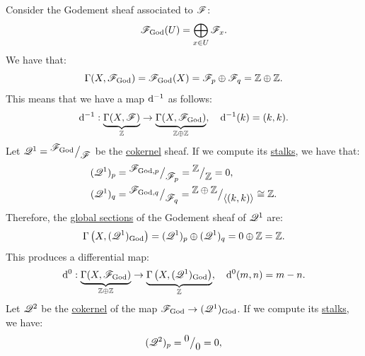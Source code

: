 \documentclass[../../main]{subfiles}
\begin{document}
\begin{example}
  Consider the Godement sheaf associated to \(\mathscr{F}\):
  \begin{equation*}
    \mathscr{F}_{\operatorname{God}}(U) = \bigoplus_{x \in U} \mathscr{F}_{x}.
  \end{equation*}
  We have that:
  \begin{equation*}
    \Gamma(X, \mathscr{F}_{\operatorname{God}}) = \mathscr{F}_{\operatorname{God}}(X) = \mathscr{F}_{p} \oplus \mathscr{F}_{q} = \mathbb{Z} \oplus \mathbb{Z}.
  \end{equation*}
  This means that we have a map \(\mathrm{d}^{-1}\) as follows:
  \begin{equation*}
    \mathrm{d}^{-1}: \underbrace{\Gamma(X, \mathscr{F})}_{\mathbb{Z}} \to \underbrace{\Gamma(X, \mathscr{F}_{\operatorname{God}})}_{\mathbb{Z} \oplus \mathbb{Z}}, \quad \mathrm{d}^{-1}(k) = (k, k).
  \end{equation*}
  Let \(\mathscr{Q}^1 = {^{\textstyle \mathscr{F}_{\operatorname{God}}}\big/_{\textstyle \mathscr{F}}}\) be the \hyperref[def:categorical-cokernel]{cokernel} sheaf.
  If we compute its \hyperref[def:stalk]{stalks}, we have that:
  \begin{align*}
    (\mathscr{Q}^1)_{p} &= {^{\textstyle \mathscr{F}_{\operatorname{God}, p}}\big/_{\textstyle \mathscr{F}_{p}}} = {^{\textstyle \mathbb{Z}}\big/_{\textstyle \mathbb{Z}}} = 0, \\
    (\mathscr{Q}^1)_{q} &= {^{\textstyle \mathscr{F}_{\operatorname{God}, q}}\big/_{\textstyle \mathscr{F}_{q}}} = {^{\textstyle \mathbb{Z} \oplus \mathbb{Z}}\big/_{\textstyle \langle(k, k)\rangle}} \cong \mathbb{Z}.
  \end{align*}
  Therefore, the \hyperref[def:global-sections-sheaf]{global sections} of the Godement sheaf of \(\mathscr{Q}^{1}\) are:
  \begin{equation*}
    \Gamma\left(X, (\mathscr{Q}^1)_{\operatorname{God}}\right) = (\mathscr{Q}^1)_{p} \oplus (\mathscr{Q}^1)_{q} = 0 \oplus \mathbb{Z} = \mathbb{Z}.
  \end{equation*}
  This produces a differential map:
  \begin{equation*}
    \mathrm{d}^{0}: \underbrace{\Gamma(X, \mathscr{F}_{\operatorname{God}})}_{\mathbb{Z} \oplus \mathbb{Z}} \to \underbrace{\Gamma\left(X, (\mathscr{Q}^1)_{\operatorname{God}}\right)}_{\mathbb{Z}}, \quad \mathrm{d}^{0}(m, n) = m - n.
  \end{equation*}
  Let \(\mathscr{Q}^2\) be the \hyperref[def:categorical-cokernel]{cokernel} of the map \(\mathscr{F}_{\operatorname{God}} \to (\mathscr{Q}^1)_{\operatorname{God}}\).
  If we compute its \hyperref[def:stalk]{stalks}, we have:
  \begin{align*}
    (\sheaf{Q}^2)_{p} &= \quot{0}{0} = 0, \\

\end{align*}
\end{example}
\end{document}
